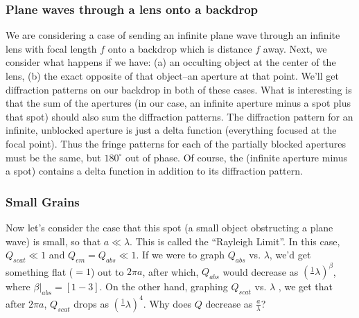 \documentclass{article}
\def\inv#1{\frac1{#1}}
\def\eval#1{\big|_{#1}}
\def\inv#1{{\frac{1}{}#1}}
\def\eval#1{\big|_{#1}}
\begin{document}
\subsubsection*{Plane waves through a lens onto a backdrop}

We are considering a case of sending an infinite plane wave through an
infinite lens with focal length $f$ onto a backdrop which is distance $f$
away.  Next, we consider what happens if we have: (a) an occulting object
at the center of the lens, (b) the exact opposite of that object--an
aperture at that point.  We'll get diffraction patterns on our backdrop in
both of these cases.  What is interesting is that the sum of the apertures
(in our case, an infinite aperture minus a spot plus that spot) should also
sum the diffraction patterns.  The diffraction pattern for an infinite, 
unblocked aperture is just a delta function (everything focused at the 
focal point).  Thus the fringe patterns for each of the partially blocked
apertures must be the same, but $180^\circ$ out of phase.  Of course,
the (infinite aperture minus a spot) contains a delta function in addition
to its diffraction pattern.\par

\subsubsection*{Small Grains}

Now let's consider the case that this spot (a small object obstructing a 
plane wave) is small, so that $a \ll \lambda$.  This is called the ``Rayleigh
Limit''.  In this case, $Q_{scat} \ll 1$ and $Q_{em} = Q_{abs} \ll 1$.  If
\def\qabs{Q_{abs}}
\def\qscat{Q_{scat}}
\def\qemis{Q_{emis}}
we were to graph $\qabs$ vs. $\lambda$, we'd get something flat ($= 1$) out to
$2\pi a$, after which, $\qabs$ would decrease as $(\inv{\lambda})^\beta$, where
$\beta\eval{abs} = [1-3]$.  On the other hand, graphing $\qscat$ vs. $\lambda$
, we get that after $2\pi a$, $\qscat$ drops as $(\inv{\lambda})^4$. 
Why does $Q$ decrease as $\frac{a}{\lambda}$?\par
\end{document}
